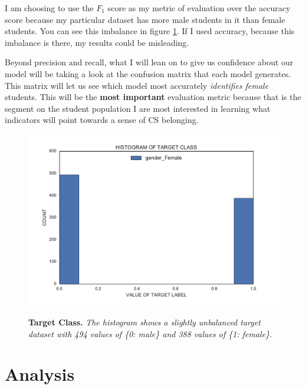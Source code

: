 I am choosing to use the $F_1$ score as my metric of evaluation over the accuracy score because my particular dataset has more male students in it than female students. You can see this imbalance in figure \ref{targetClass}. If I used accuracy, because this imbalance is there, my results could be misleading. 

Beyond precision and recall, what I will lean on to give us confidence about our model will be taking a look at the confusion matrix that each model generates. This matrix will let us see which model most accurately \emph{identifies female} students. This will be the \textbf{most important} evaluation metric because that is the segment on the student population I are most interested in learning what indicators will point towards a sense of CS belonging.

\begin{figure}[!hbtp]
\centering

    \caption{\textbf{Target Class. }\textit{The histogram shows a slightly unbalanced target dataset with 494 values of \{0: male\} and 388 values of \{1: female\}.}}

    \includegraphics[width=1\textwidth]{figures/targetClass}
    \label{targetClass}
\end{figure}


\chapter*{Analysis}

